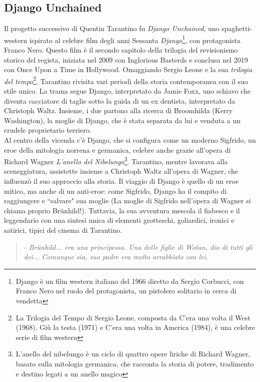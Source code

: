\documentclass[12pt]{article} %
\begin{document}
\subsection{Django Unchained}
\begin{flushleft}
    Il progetto successivo di Quentin Tarantino fu \textit{Django Unchained}, uno spaghetti-western ispirato al celebre film degli anni Sessanta \textit{Django}\footnote{Django è un film western italiano del 1966 diretto da Sergio Corbucci, con Franco Nero nel ruolo del protagonista, un pistolero solitario in cerca di vendetta}, con protagonista Franco Nero. Questo film è il secondo capitolo della trilogia del revisionismo storico del regista, iniziata nel 2009 con Inglorious Basterds e conclusa nel 2019 con Once Upon a Time in Hollywood. Omaggiando Sergio Leone e la sua \textit{trilogia del tempo}\footnote{La Trilogia del Tempo di Sergio Leone, composta da C'era una volta il West (1968), Giù la testa (1971) e C'era una volta in America (1984), è una celebre serie di film western}, Tarantino rivisita vari periodi della storia contemporanea con il suo stile unico. 
    La trama segue Django, interpretato da Jamie Foxx, uno schiavo che diventa cacciatore di taglie sotto la guida di un ex dentista, interpretato da Christoph Waltz. Insieme, i due partono alla ricerca di Broomhilda (Kerry Washington), la moglie di Django, che è stata separata da lui e venduta a un crudele proprietario terriero.  
    \\\vspace{1cm}
    Al centro della vicenda c'è Django, che si configura come un moderno Sigfrido, un eroe della mitologia norrena e germanica, celebre anche grazie all'opera di Richard Wagner \textit{L'anello del Nibelungo}\footnote{L'anello del nibelungo è un ciclo di quattro opere liriche di Richard Wagner, basato sulla mitologia germanica, che racconta la storia di potere, tradimento e destino legati a un anello magico}. 
    Tarantino, mentre lavorava alla sceneggiatura, assistette insieme a Christoph Waltz all'opera di Wagner, che influenzò il suo approccio alla storia. 
    Il viaggio di Django è quello di un eroe mitico, ma anche di un anti-eroe: come Sigfrido, Django ha il compito di raggiungere e ``salvare" sua moglie (La moglie di Sigfrido nell'opera di Wagner si chiama proprio Brünhild!). 
    Tuttavia, la sua avventura mescola il fiabesco e il leggendario con una sintesi unica di elementi grotteschi, goliardici, ironici e satirici, tipici del cinema di Tarantino.
    \begin{quote}\textit{
        - Brünhild... era una principessa. Una delle figlie di Wotan, dio di tutti gli dei... Comunque sia, suo padre era molto arrabbiato con lei.
}
\end{quote}
\end{flushleft}
\end{document}
